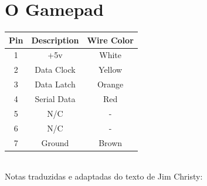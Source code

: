 \documentclass[paper=a4, fontsize=11pt]{scrartcl}	%
\numberwithin{equation}{section}															%
\numberwithin{figure}{section}																%
\numberwithin{table}{section}																%
\begin{document}
\section{O Gamepad}
\begin{tabular}{ccc}
Pin	& Description	& Wire Color\\
\hline 1 & +5v	& White\\
2 & Data Clock &Yellow\\
3 & Data Latch & Orange\\
4 & Serial Data	& Red\\
5 & N/C & -\\
6 & N/C & -\\
7 & Ground & Brown\\
\end{tabular}\\

Notas traduzidas e adaptadas do texto de Jim Christy\cite{jimc}:\\
\end{document}
